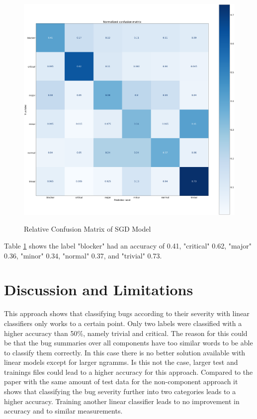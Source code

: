 \documentclass[sigconf,screen]{acmart}
\begin{document}
\begin{figure}[h]
	\caption{Relative Confusion Matrix of SGD Model}
	\centering
	\includegraphics[scale=0.1]{norm_conf_matrix_sgd}
	\label{fig:confMatSGD}	
\end{figure}

Table \ref{fig:confMatSGD} shows the label "blocker" had an accuracy of 0.41, "critical"  0.62, "major" 0.36, "minor" 0.34, "normal" 0.37, and "trivial" 0.73.


\section{Discussion and Limitations}
This approach shows that classifying bugs according to their severity with linear classifiers only works to a certain point. Only two labels were classified with a higher accuracy than 50\%, namely trivial and critical. The reason for this could be that the bug summaries over all components have too similar words to be able to classify them correctly. In this case there is no better solution available with linear models except for larger ngramms. Is this not the case, larger test and trainings files could lead to a higher accuracy for this approach. Compared to the paper \cite{ourPaper} with the same amount of test data for the non-component approach it shows that classifying the bug severity further into two categories leads to a higher accuracy. Training another linear classifier leads to no improvement in accuracy and to similar measurements.
\end{document}
